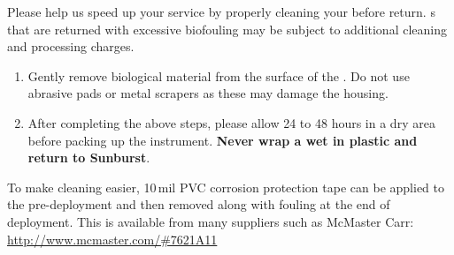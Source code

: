     \begin{minipage}[t]{0.5\textwidth}
    Please help us speed up your service by properly cleaning your \instType{} before return.  \instType{}s that are returned with excessive biofouling may be subject to additional cleaning and processing charges.\\
    
    \begin{enumerate}
    \item Gently remove biological material from the surface of the \instType{}.  Do not use abrasive pads or metal scrapers as these may damage the housing.\\
    
    \item After completing the above steps, please allow 24 to 48 hours in a dry area before packing up the instrument. \textbf{Never wrap a wet \instType{} in plastic and return to Sunburst}.
\end{enumerate}

    \vspace*{6.5cm}
    \noindent
    To make cleaning easier, 10\,mil PVC corrosion protection tape can be applied to the \instType{} pre-deployment and then removed along with fouling at the end of deployment. This is available from many suppliers such as McMaster Carr:
    \newline
    \url{http://www.mcmaster.com/#7621A11}
    \end{minipage}

